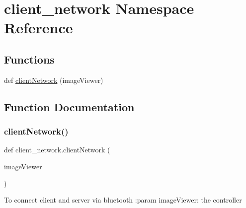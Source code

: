 \hypertarget{namespaceclient__network}{}\section{client\+\_\+network Namespace Reference}
\label{namespaceclient__network}
\subsection*{Functions}
\begin{DoxyCompactItemize}
\item 
def \hyperlink{namespaceclient__network_ab750c0c817fe8ed00e42c02c47d7e049}{client\+Network} (image\+Viewer)
\end{DoxyCompactItemize}


\subsection{Function Documentation}
\mbox{\label{namespaceclient__network_ab750c0c817fe8ed00e42c02c47d7e049}} 
\subsubsection{\texorpdfstring{client\+Network()}{clientNetwork()}}
{\footnotesize\ttfamily def client\+\_\+network.\+client\+Network (\begin{DoxyParamCaption}\item[{}]{image\+Viewer }\end{DoxyParamCaption})}

\begin{DoxyVerb}    To connect client and server via bluetooth
    :param imageViewer: the controller
\end{DoxyVerb}
 